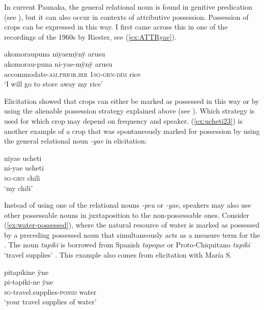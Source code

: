 \largerpage
In current Paunaka, the general relational noun is found in genitive predication (see ), but it can also occur in contexts of attributive possession. Possession of crops can be expressed in this way. I first came across this in one of the recordings  of the 1960s by Riester, see (\ref{ex:ATTRyae}). 

\ea\label{ex:ATTRyae}
\begingl 
\glpreamble akomoraupuna niyaemÿnÿ arusu\\
\gla akomorau-puna ni-yae-mÿnÿ arusu\\ 
\glb accommodate-\textsc{am.prior}.\textsc{irr} 1\textsc{sg}-\textsc{grn}-\textsc{dim} rice\\ 
\glft ‘I will go to store away my rice’
\trailingcitation{[nxx-p630101g-1.006]}
\xe

Elicitation showed that crops can either be marked as possessed in this way or by using the alienable possession strategy explained above (see ). Which strategy is used for which crop may depend on frequency and speaker. (\ref{ex:ucheti23}) is another example of a crop that was spontaneously marked for possession by using the general relational noun \textit{-yae} in elicitation:

\ea\label{ex:ucheti23}
\begingl 
\glpreamble niyae ucheti\\
\gla ni-yae ucheti\\ 
\textsc{sg}-\textsc{grn} chili\\ 
\glft ‘my chili’
\trailingcitation{[rxx-e181018le]}
\xe


Instead of using one of the relational nouns \textit{-peu} or \textit{-yae}, speakers may also use other possessable nouns in juxtaposition to the non-possessable ones. Consider (\ref{ex:water-possessed}), where the natural resource of water is marked as possessed by a preceding possessed noun that simultaneously acts as a measure term for the . The noun \textit{tapiki} is borrowed from Spanish \textit{tapeque} or Proto-Chiquitano \textit{tapiki} ‘travel supplies’ \citep[cf.][9]{Nikulin2019}. This example also comes from elicitation with María S.

\ea\label{ex:water-possessed}
\begingl 
\glpreamble pitapikine ÿne\\
\gla pi-tapiki-ne ÿne\\ 
\textsc{sg}-travel.supplies-\textsc{possd} water\\ 
\glft ‘your travel supplies of water’
\trailingcitation{[rxx-e181018le]}
\xe


